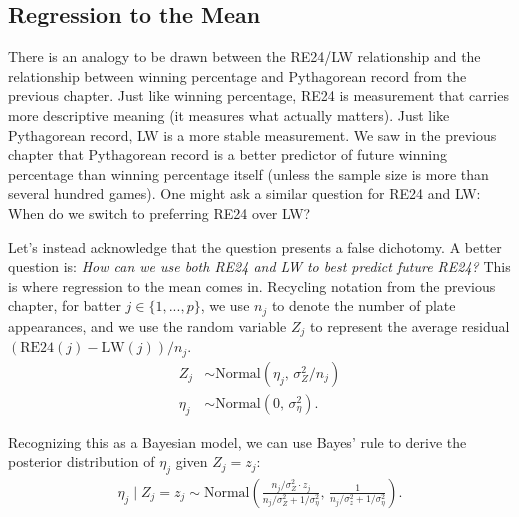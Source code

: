 \documentclass{article}
\begin{document}
    \subsection{\sc Regression to the Mean}

      There is an analogy to be drawn between the RE24/LW relationship and the relationship between winning percentage and Pythagorean record from the previous chapter. Just like winning percentage, RE24 is measurement that carries more descriptive meaning (it measures what actually matters). Just like Pythagorean record, LW is a more stable measurement. We saw in the previous chapter that Pythagorean record is a better predictor of future winning percentage than winning percentage itself (unless the sample size is more than several hundred games). One might ask a similar question for RE24 and LW: When do we switch to preferring RE24 over LW?

      Let's instead acknowledge that the question presents a false dichotomy. A better question is: {\it How can we use both RE24 and LW to best predict future RE24?} This is where regression to the mean comes in. Recycling notation from the previous chapter, for batter $j \in \{1, ..., p\}$, we use $n_j$ to denote the number of plate appearances, and we use the random variable $Z_j$ to represent the average residual $(\mbox{RE24}(j) - \mbox{LW}(j)) / n_j$.
      \begin{align*}
        Z_j &\sim \mbox{Normal}(\eta_j,\, \sigma^2_Z / n_j)\\
        \eta_j &\sim \mbox{Normal}(0,\, \sigma^2_\eta).
      \end{align*}

      Recognizing this as a Bayesian model, we can use Bayes' rule to derive the posterior distribution of $\eta_j$ given $Z_j = z_j$:
      \begin{align*}
        \eta_j \mid Z_j = z_j \sim \mbox{Normal}\left(\frac{n_j / \sigma^2_Z \cdot z_j}{n_j / \sigma^2_Z + 1 / \sigma^2_\eta},\, \frac{1}{n_j / \sigma^2_z + 1 / \sigma^2_\eta}\right).
      \end{align*}
\end{document}
